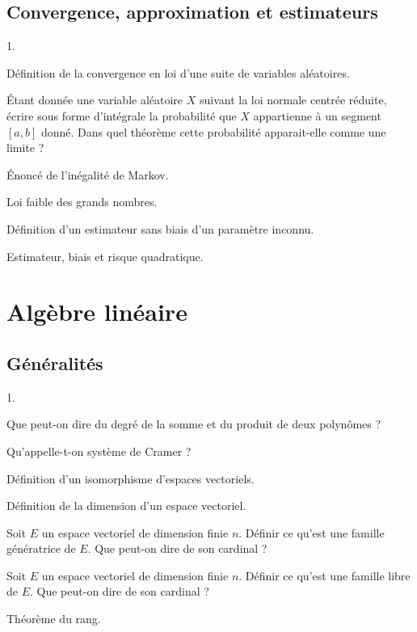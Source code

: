 \documentclass[11pt]{article}%
\begin{document}
\subsection*{Convergence, approximation et estimateurs}

\begin{noliste}{1.}
\item Définition de la convergence en loi d'une suite de variables aléatoires.
\item Étant donnée une variable aléatoire $X$ suivant la loi normale
  centrée réduite, écrire sous forme d'intégrale la probabilité que
  $X$ appartienne à un segment $[a,b]$ donné. Dans quel théorème cette
  probabilité apparait-elle comme une limite ?
\item Énoncé de l'inégalité de Markov.
\item Loi faible des grands nombres.
\item Définition d'un estimateur sans biais d'un paramètre inconnu.
\item Estimateur, biais et risque quadratique.
\end{noliste}

\section*{Algèbre linéaire}

\subsection*{Généralités}

\begin{noliste}{1.}
\item Que peut-on dire du degré de la somme et du produit de deux polynômes ?
\item Qu'appelle-t-on système de Cramer ?
\item Définition d'un isomorphisme d'espaces vectoriels.
\item Définition de la dimension d'un espace vectoriel.
\item Soit $E$ un espace vectoriel de dimension finie $n$. Définir ce
  qu'est une famille génératrice de $E$. Que peut-on dire de son
  cardinal ?
\item Soit $E$ un espace vectoriel de dimension finie $n$. Définir ce
  qu'est une famille libre de $E$. Que peut-on dire de son cardinal ?
\item Théorème du rang.
\end{noliste}
\end{document}
